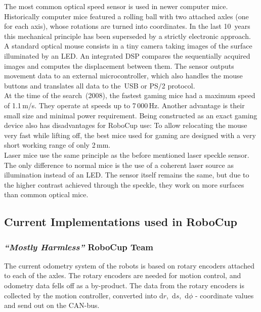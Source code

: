 \documentclass[12pt,a4paper]{article}
\newcommand{\MH}{\emph{``Mostly Harmless''} RoboCup Team\xspace}
\begin{document}
The most common optical speed sensor is used in newer computer mice.
Historically computer mice featured a rolling ball with two attached axles (one for each axis), whose rotations are turned into coordinates.
In the last 10~years this mechanical principle has been superseded by a strictly electronic approach.\\
A standard optical mouse consists in a tiny camera taking images of the surface illuminated by an LED.
An integrated DSP compares the sequentially acquired images and computes the displacement between them.
The sensor outputs movement data to an external microcontroller, which also handles the mouse buttons and translates all data to the~USB or PS/2 protocol.\\
At the time of the search~(2008), the fastest gaming mice had a maximum speed of 1.1\,m/s.
They operate at speeds up to 7\,000\,Hz.
Another advantage is their small size and minimal power requirement.
Being constructed as an exact gaming device also has disadvantages for RoboCup use:
To allow relocating the mouse very fast while lifting off, the best mice used for gaming are designed with a very short working range of only 2\,mm.\\
Laser mice use the same principle as the before mentioned laser speckle sensor.
The only difference to normal mice is the use of a coherent laser source as illumination instead of an LED.
The sensor itself remains the same, but due to the higher contrast achieved through the speckle, they work on more surfaces than common optical mice.


\subsection{Current Implementations used in RoboCup}

\subsubsection{\MH}

The current odometry system of the robots is based on rotary encoders attached to each of the axles. 
The rotary encoders are needed for motion control, and odometry data fells off as a by-product.
The data from the rotary encoders is collected by the motion controller, converted into d$r$,~d$s$,~d$\phi$ - coordinate values and send out on the CAN-bus.
\end{document}

